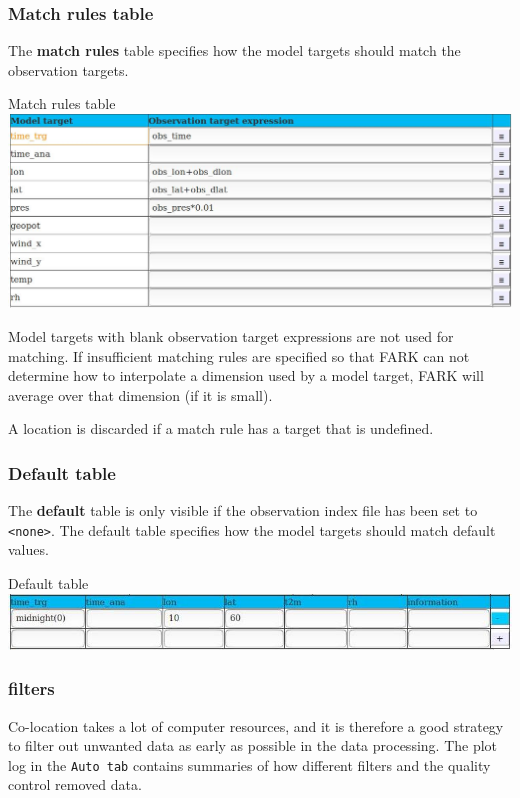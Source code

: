 \documentclass[letterpaper,10pt,twoside,twocolumn,openany]{book}
\begin{document}
\subsubsection{Match rules table}
The {\bf match rules} table specifies how the model targets should match the
observation targets. 
\begin{paperbox}{Match rules table}
  \includegraphics[width=\columnwidth]{coloc_match.jpg}
\end{paperbox}
Model targets with blank observation target expressions are not used for matching.
If insufficient matching rules are specified so that FARK can not determine how to
interpolate a dimension used by a model target, FARK will average over that dimension (if it is small).

\begin{quotebox}
A location is discarded if a match rule has a target that is undefined.
\end{quotebox}

\hypertarget{default}{}
\subsubsection{Default table}
The {\bf default} table is only visible if the observation index file has been set to \lstinline!<none>!.
The default table specifies how the model targets should match default values.
\begin{paperbox}{Default table}
  \includegraphics[width=\columnwidth]{default.jpg}
\end{paperbox}

\subsubsection{filters}

Co-location takes a lot of computer resources, and it is therefore a good strategy
to filter out unwanted data as early as possible in the data processing.
The plot log in the \lstinline!Auto tab! contains summaries of how different filters and the quality control removed data.
\end{document}
